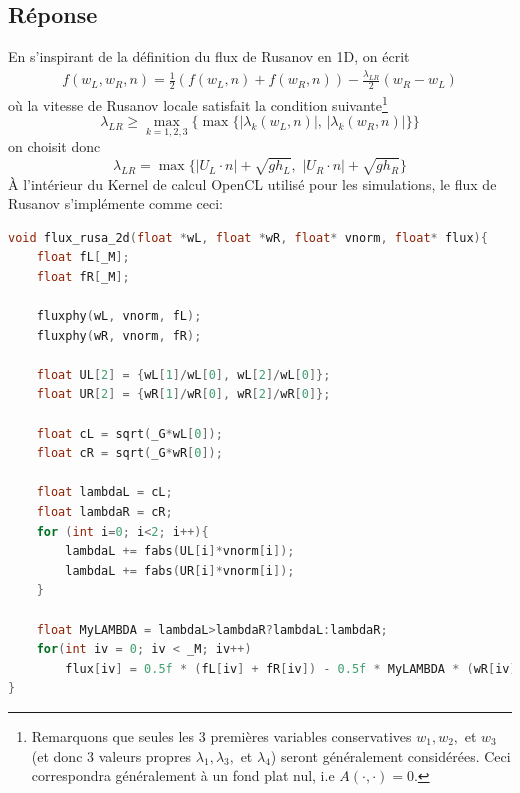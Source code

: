 \documentclass[
	french,
	11pt, %
]{fphw}
\begin{document}
\subsection*{Réponse} 
En s'inspirant de la définition du flux de Rusanov en 1D, on écrit
\begin{align*}
	f(w_L, w_R, n) = \frac{1}{2}\left( f(w_L,n)+f(w_R,n)  \right) - \frac{\lambda_{LR}}{2}(w_R - w_L)
\end{align*}
où la vitesse de Rusanov locale satisfait la condition suivante\footnote{Remarquons que seules les 3 premières variables conservatives $w_1,w_2,$ et $w_3$ (et donc 3 valeurs propres $\lambda_1, \lambda_3,$ et $\lambda_4$) seront généralement considérées. Ceci correspondra généralement à un fond plat nul, i.e $A(\cdot,\cdot)=0$. } 
$$
\lambda_{LR} \geq \max_{k=1,2,3}{\big\{ \max{ \big\{ \vert \lambda_k(w_L,n) \vert, \, \vert \lambda_k(w_R,n) \vert }\big\} \big\}}
$$
on choisit donc 
$$
\lambda_{LR} = \max{ \Big\{ \vert U_L\cdot n \vert + \sqrt{gh_L}, \,\, \vert U_R\cdot n \vert + \sqrt{gh_R} }\Big\}
$$
À l'intérieur du Kernel de calcul OpenCL utilisé pour les simulations, le flux de Rusanov s'implémente comme ceci:
\begin{lstlisting}[language=C, caption={Flux numérique de Rusanov en 2D},breaklines]
void flux_rusa_2d(float *wL, float *wR, float* vnorm, float* flux){
	float fL[_M];
	float fR[_M];
	
	fluxphy(wL, vnorm, fL);
	fluxphy(wR, vnorm, fR);
	
	float UL[2] = {wL[1]/wL[0], wL[2]/wL[0]};
	float UR[2] = {wR[1]/wR[0], wR[2]/wR[0]};
	
	float cL = sqrt(_G*wL[0]);
	float cR = sqrt(_G*wR[0]);
	
	float lambdaL = cL;
	float lambdaR = cR;
	for (int i=0; i<2; i++){
		lambdaL += fabs(UL[i]*vnorm[i]);
		lambdaL += fabs(UR[i]*vnorm[i]);
	}
	
	float MyLAMBDA = lambdaL>lambdaR?lambdaL:lambdaR;
	for(int iv = 0; iv < _M; iv++)
		flux[iv] = 0.5f * (fL[iv] + fR[iv]) - 0.5f * MyLAMBDA * (wR[iv] - wL[iv]); 
}
\end{lstlisting}
\end{document}
